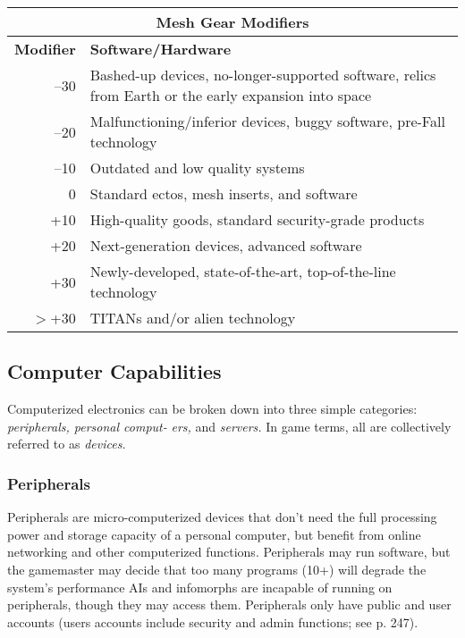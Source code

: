 \begin{table} \begin{tabular}{|r|l|} \hline

\multicolumn{2}{|c|}{\textbf{Mesh Gear Modifiers}} \\ \hline

\textbf{Modifier} &\textbf{Software/Hardware} \\ \hline

–30 &Bashed-up devices, no-longer-supported software, relics from Earth or the early expansion into space \\ \hline

–20 &Malfunctioning/inferior devices, buggy software, pre-Fall technology \\ \hline

–10 &Outdated and low quality systems \\ \hline

0 &Standard ectos, mesh inserts, and software \\ \hline

+10 &High-quality goods, standard security-grade products \\ \hline

+20 &Next-generation devices, advanced software \\ \hline

+30 &Newly-developed, state-of-the-art, top-of-the-line technology \\ \hline

$>$+30 &TITANs and/or alien technology \\ \hline

\end{tabular} \label{tab:mesh-gear-modifiers} \end{table} 

\subsection{Computer Capabilities} 

Computerized electronics can be broken down into three simple categories: \textit{peripherals, personal comput-} \textit{ers, }and \textit{servers.} In game terms, all are collectively referred to as \textit{devices.} 

\subsubsection{Peripherals} 

Peripherals are micro-computerized devices that don't need the full processing power and storage capacity of a personal computer, but benefit from online networking and other computerized functions. Peripherals may run software, but the gamemaster may decide that too many programs (10+) will degrade the system's performance AIs and infomorphs are incapable of running on peripherals, though they may access them. Peripherals only have public and user accounts (users accounts include security and admin functions; see p. 247). 

